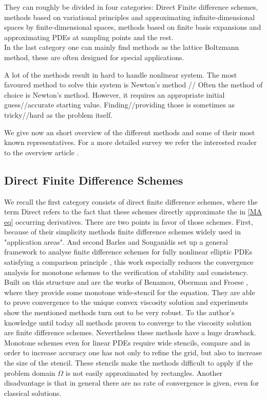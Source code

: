 They can roughly be divided in four categories: Direct Finite difference schemes, methods based on variational principles and approximating infinite-dimensional spaces by finite-dimensional spaces, methods based on finite basis expansions and approximating PDEs at sampling points and the rest. \\
In the last category one can mainly find methods as the lattice Boltzmann method, these are often designed for special applications.

A lot of the methods result in hard to handle nonlinear system. The most favoured method to solve this system is Newton's method // Often the method of choice is Newton's method. However, it requires an appropriate initial guess//accurate starting value. Finding//providing those is sometimes as tricky//hard as the problem itself.

We give now an short overview of the different methods and some of their most known representatives. For a more detailed survey we refer the interested reader to the overview article \cite[Section 2.1]{FGN2013}.


\subsection{Direct Finite Difference Schemes}

We recall the first category consists of direct finite difference schemes, where the term Direct refers to the fact that these schemes directly approximate the in \eqref{MA eq} occurring derivatives. 
There are two points in favor of those schemes. First, because of their simplicity methods finite difference schemes widely used in "application areas".  And second Barles and Souganidis set up a general framework to analyse finite difference schemes for fully nonlinear elliptic PDEs satisfying a comparison principle \cite{BS1991}, this work especially reduces the convergence analysis for monotone schemes to the verification of stability and consistency.
Built on this structure and are the works of Benamou, Oberman and Froese \cite{BFO2010, Oberman2008, FO2011}, where they provide some monotone wide-stencil for the \MA equation.
They are able to prove convergence to the unique convex viscosity solution and experiments show the mentioned methods turn out to be very robust. To the author's knowledge until today all methods proven to converge to the viscosity solution are finite difference schemes.
Nevertheless these methods have a huge drawback. Monotone schemes even for linear PDEs require wide stencils, compare \cite{MW1953}  and in order to increase accuracy one has not only to refine the grid, but also to increase the size of the stencil. These stencils make the methods difficult to apply if the problem domain $\Omega$ is not easily approximated by rectangles. Another disadvantage is that in general there are no rate of convergence is given, even for classical solutions.

